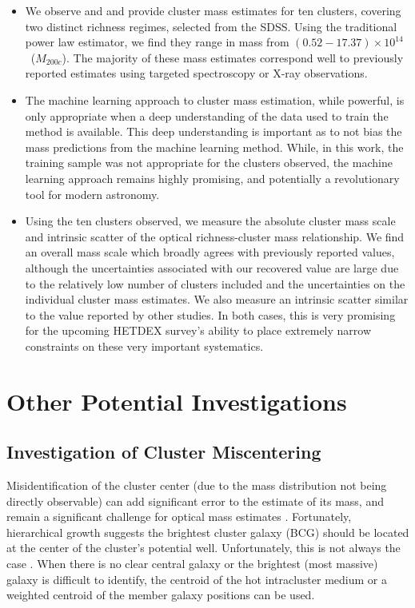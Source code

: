 \begin{itemize}
	\item We observe and and provide cluster mass estimates for ten clusters, covering two distinct richness regimes, selected from the SDSS. Using the traditional power law estimator, we find they range in mass from $(0.52-17.37) \times 10^{14}$ \Msol\ ($M_{200c}$). The majority of these mass estimates correspond well to previously reported estimates using targeted spectroscopy or X-ray observations.
	
	\item The machine learning approach to cluster mass estimation, while powerful, is only appropriate when a deep understanding of the data used to train the method is available. This deep understanding is important as to not bias the mass predictions from the machine learning method. While, in this work, the training sample was not appropriate for the clusters observed, the machine learning approach remains highly promising, and potentially a revolutionary tool for modern astronomy.
	
	\item Using the ten clusters observed, we measure the absolute cluster mass scale and intrinsic scatter of the optical richness-cluster mass relationship. We find an overall mass scale which broadly agrees with previously reported values, although the uncertainties associated with our recovered value are large due to the relatively low number of clusters included and the uncertainties on the individual cluster mass estimates. We also measure an intrinsic scatter similar to the value reported by other studies. In both cases, this is very promising for the upcoming HETDEX survey's ability to place extremely narrow constraints on these very important systematics.
\end{itemize}

\section{Other Potential Investigations}\label{sec: future}
\subsection{Investigation of Cluster Miscentering}
Misidentification of the cluster center (due to the mass distribution not being directly observable) can add significant error to the estimate of its mass, and remain a significant challenge for optical mass estimates . Fortunately, hierarchical growth suggests the brightest cluster galaxy (BCG) should be located at the center of the cluster's potential well. Unfortunately, this is not always the case . When there is no clear central galaxy or the brightest (most massive) galaxy is difficult to identify, the centroid of the hot intracluster medium or a weighted centroid of the member galaxy positions  can be used.

